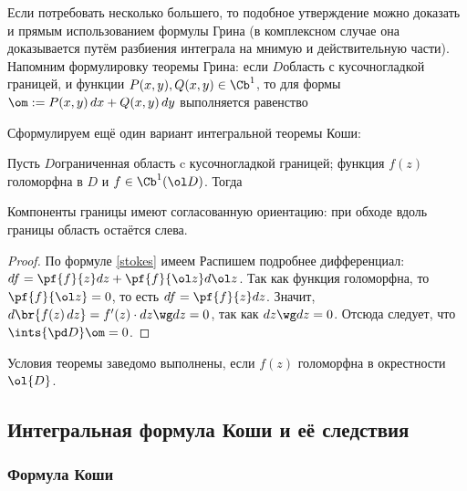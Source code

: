 \documentclass[a4paper]{article}
\begin{document}
Если потребовать несколько большего, то подобное утверждение можно доказать и прямым использованием
формулы Грина (в комплексном случае она доказывается путём разбиения интеграла на мнимую и действительную части).
Напомним формулировку теоремы Грина: если $D$\т область с кусочно\д гладкой границей, и функции $P(x,y), Q(x,y) \in \Cb^1$,
то для формы $\om := P(x,y)\,dx + Q(x,y)\,dy$ выполняется равенство

Сформулируем ещё один вариант интегральной теоремы Коши:
\begin{theorem}[Коши]
Пусть $D$\т ограниченная область c кусочно\д гладкой границей; функция $f(z)$ голоморфна в $D$ и $f\in \Cb^1(\ol D)$.
Тогда
\end{theorem}
\begin{note}
Компоненты границы имеют согласованную ориентацию: при обходе вдоль границы область остаётся слева.
\end{note}
\begin{proof}
По формуле \eqref{stokes} имеем
Распишем подробнее дифференциал: $df = \pf{f}{z}dz + \pf{f}{\ol z}d\ol z$. Так как функция голоморфна, то
$\pf{f}{\ol z} = 0$, то есть $df = \pf{f}{z}dz$.
Значит, $d\br{f(z)\,dz} = f'(z) \cdot dz \wg dz = 0$, так как $dz \wg dz = 0$. Отсюда следует,
что $\ints{\pd D}\om = 0$.
\end{proof}
\begin{note}
Условия теоремы заведомо выполнены, если $f(z)$ голоморфна в окрестности $\ol{D}$.
\end{note}

\subsection{Интегральная формула Коши и её следствия}

\subsubsection{Формула Коши}
\end{document}
